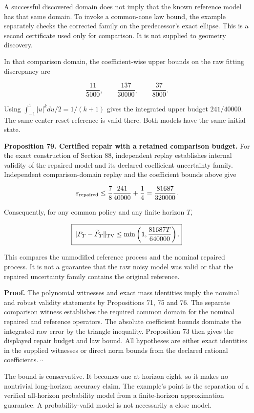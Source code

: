 A successful discovered domain does not imply that the known reference
model has that same domain. To invoke a common-cone law bound, the
example separately checks the corrected family on the predecessor's
exact ellipse. This is a second certificate used only for comparison. It
is not supplied to geometry discovery.

In that comparison domain, the coefficient-wise upper bounds on the raw
fitting discrepancy are

\[
\frac{11}{5000},\qquad \frac{137}{30000},\qquad \frac{37}{8000}.
\]

Using \(\int_{-1}^1|u|^kdu/2=1/(k+1)\) gives the integrated upper budget
\(241/40000\). The same center-reset reference is valid there. Both
models have the same initial state.

\textbf{Proposition 79. Certified repair with a retained comparison
budget.} For the exact construction of Section 88, independent replay
establishes internal validity of the repaired model and its declared
coefficient uncertainty family. Independent comparison-domain replay and
the coefficient bounds above give

\[
\varepsilon_{\rm repaired}
\leq\frac78\frac{241}{40000}+\frac14
=\frac{81687}{320000}.
\]

Consequently, for any common policy and any finite horizon \(T\),

\[
\boxed{
\|P_T-\widetilde P_T\|_{\rm TV}
\leq\min\left(1,\frac{81687T}{640000}\right).
}
\]

This compares the unmodified reference process and the nominal repaired
process. It is not a guarantee that the raw noisy model was valid or
that the repaired uncertainty family contains the original reference.

\textbf{Proof.} The polynomial witnesses and exact mass identities imply
the nominal and robust validity statements by Propositions 71, 75 and
76. The separate comparison witness establishes the required common
domain for the nominal repaired and reference operators. The absolute
coefficient bounds dominate the integrated raw error by the triangle
inequality. Proposition 73 then gives the displayed repair budget and
law bound. All hypotheses are either exact identities in the supplied
witnesses or direct norm bounds from the declared rational coefficients.
\(\square\)

The bound is conservative. It becomes one at horizon eight, so it makes
no nontrivial long-horizon accuracy claim. The example's point is the
separation of a verified all-horizon probability model from a
finite-horizon approximation guarantee. A probability-valid model is not
necessarily a close model.


